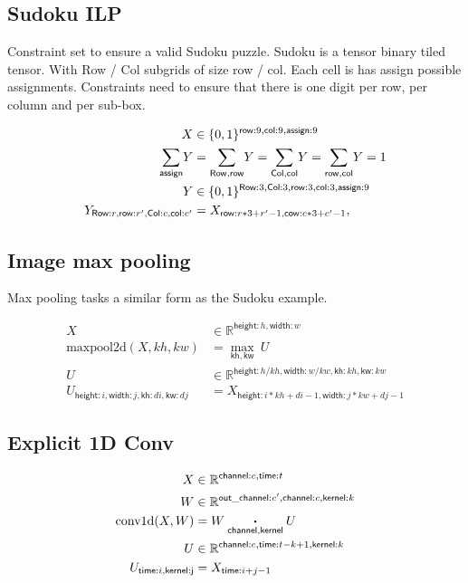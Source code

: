 \documentclass{article}
\newcommand{\reals}[0]{\mathbb{R}}
\newcommand{\nsum}[1]{\mathbin{\mathop{\sum}\displaylimits_{\name{#1}}}}
\newcommand{\nfun}[2]{\underset{\name{#1}}{#2}}
\newcommand{\name}[1]{\mathsf{#1}}
\newcommand{\ndot}[1]{\mathbin{\mathop{\thinspace\boldsymbol\cdot\thinspace}\displaylimits_{\name{#1}}}}
\begin{document}
\subsection*{Sudoku ILP}

Constraint set to ensure a valid Sudoku puzzle. Sudoku is a tensor binary tiled tensor. With Row / Col subgrids of size row / col. Each cell is has assign possible assignments. 
Constraints need to ensure that there is one digit per row, per column and per sub-box. 

\begin{align*} 
X &\in \{0, 1\}^{\name{row}: 9, \name{col}:9, \name{assign}:9}  \\
\nsum{assign} Y &= 
\nsum{Row,row} Y = 
\nsum{Col, col} Y =  
\nsum{row, col} Y = 1\\
Y &\in \{0, 1\}^{\name{Row}: 3, \name{Col}:3, \name{row}: 3, \name{col}:3, \name{assign}:9}  \\
Y_{\name{Row}:r, \name{row}:r', \name{Col}:c, \name{col}:c'} &= X_{\name{row}:r*3 + r'-1, \name{cow}:c*3 + c'-1}, 
\end{align*} 


\subsection*{Image max pooling}

Max pooling tasks a similar form as the Sudoku example.

\begin{align*} 
X &\in \reals^{\name{height}: h, \name{width}:w} \\
\text{maxpool2d}(X, kh, kw) &=  \nfun{kh, kw}{\max}\  U \\
U &\in \reals^{{\name{height}:h / kh,
\name{width}:w / kw, \name{kh}:kh, \name{kw}:kw}}  \\
U_{\name{height}:i, \name{width}:j, \name{kh}:di, \name{kw}:dj  } & = X_{\name{height}:i * kh + di -1, \name{width}:j * kw + dj -1}  
\end{align*}



\subsection*{Explicit 1D Conv}

\begin{align*} 
X &\in \reals^{{\name{channel}:c, \name{time}:t}}  \\
W &\in \reals^{{\name{out\_channel}:c', \name{channel}:c, \name{kernel}:k}}  \\
\text{conv1d}(X, W) &= W \ndot{channel, kernel} U \\
U &\in \reals^{{\name{channel}:c, \name{time}:t-k +1, \name{kernel}:k}}  \\
U_{\name{time}:i, \name{kernel:j}} & = X_{\name{time}:i+j - 1}  
\end{align*} 
\end{document}
